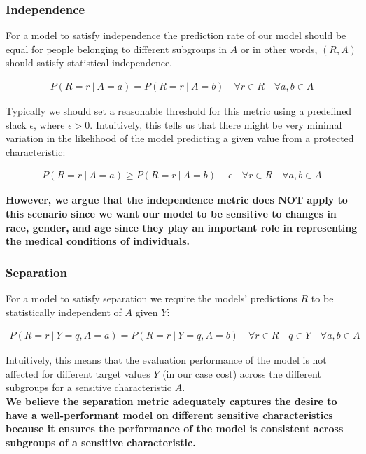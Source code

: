 \documentclass[11pt]{article}
\begin{document}
\subsubsection{Independence}

For a model to satisfy independence the prediction rate of our model should be equal for people belonging to different subgroups in $A$ or in other words, $(R, A)$ should satisfy statistical independence.

\begin{align*}
    P(R=r\ |\ A=a)=P(R=r\ |\ A=b)\quad \forall r\in R\quad \forall a,b \in A
\end{align*}

Typically we should set a reasonable threshold for this metric using a predefined slack $\epsilon$, where $\epsilon > 0$. Intuitively, this tells us that there might be very minimal variation in the likelihood of the model predicting a given value from a protected characteristic:

\begin{align*}
    P(R=r\ |\ A=a)\geq P(R=r\ |\ A=b)-\epsilon \quad \forall r\in R\quad \forall a,b\in A
\end{align*}

\textbf{However, we argue that the independence metric does NOT apply to this scenario since we want our model to be sensitive to changes in race, gender, and age since they play an important role in representing the medical conditions of individuals.}

\subsubsection{Separation}

For a model to satisfy separation we require the models' predictions $R$ to be statistically independent of $A$ given $Y$:

\begin{align*}
    P(R=r\ |\ Y=q,A=a)=P(R=r\ |\ Y=q,A=b)\quad \forall r\in R\quad q\in Y\quad \forall a,b\in A
\end{align*}

Intuitively, this means that the evaluation performance of the model is not affected for different target values $Y$ (in our case cost) across the different subgroups for a sensitive characteristic $A$.\\

\textbf{We believe the separation metric adequately captures the desire to have a well-performant model on different sensitive characteristics because it ensures the performance of the model is consistent across subgroups of a sensitive characteristic.}
\end{document}
